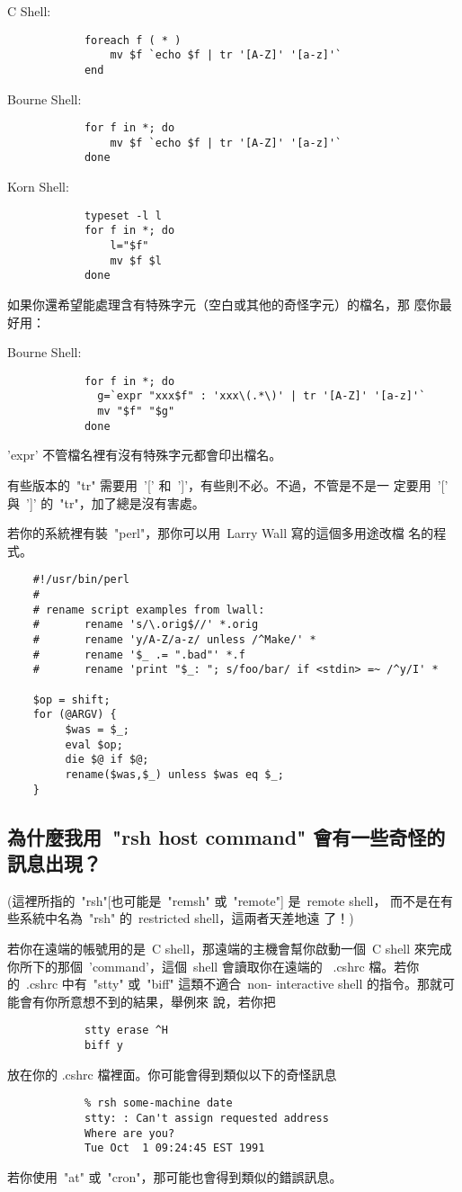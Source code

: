 \documentclass{article}
\begin{document}
\begin{CJK*}{Bg5}{ming}
        C Shell:
\begin{verbatim}
            foreach f ( * )
                mv $f `echo $f | tr '[A-Z]' '[a-z]'`
            end
\end{verbatim}

        Bourne Shell:
\begin{verbatim}
            for f in *; do
                mv $f `echo $f | tr '[A-Z]' '[a-z]'`
            done
\end{verbatim}

        Korn Shell:
\begin{verbatim}
            typeset -l l
            for f in *; do
                l="$f"
                mv $f $l
            done
\end{verbatim}
	如果你還希望能處理含有特殊字元（空白或其他的奇怪字元）的檔名，那
	麼你最好用：

        Bourne Shell:
\begin{verbatim}
            for f in *; do
              g=`expr "xxx$f" : 'xxx\(.*\)' | tr '[A-Z]' '[a-z]'`
              mv "$f" "$g"
            done
\end{verbatim}
	'expr' 不管檔名裡有沒有特殊字元都會印出檔名。

	有些版本的~"tr" 需要用~'[' 和~']'，有些則不必。不過，不管是不是一
	定要用~'['  與~']' 的~"tr"，加了總是沒有害處。

	若你的系統裡有裝~"perl"，那你可以用~Larry Wall 寫的這個多用途改檔
	名的程式。 
\begin{verbatim}
	#!/usr/bin/perl
	#
	# rename script examples from lwall:
	#       rename 's/\.orig$//' *.orig
	#       rename 'y/A-Z/a-z/ unless /^Make/' *
	#       rename '$_ .= ".bad"' *.f
	#       rename 'print "$_: "; s/foo/bar/ if <stdin> =~ /^y/I' *

	$op = shift;
	for (@ARGV) {
	     $was = $_;
	     eval $op;
	     die $@ if $@;
	     rename($was,$_) unless $was eq $_;
	}
\end{verbatim}

\subsection{為什麼我用~"rsh host command" 會有一些奇怪的訊息出現？}

	(這裡所指的~"rsh"[也可能是~"remsh" 或~"remote"] 是~remote shell，
	而不是在有些系統中名為~"rsh" 的~restricted shell，這兩者天差地遠
	了！)

	若你在遠端的帳號用的是~C shell，那遠端的主機會幫你啟動一個~C 
	shell 來完成你所下的那個~'command'，這個~shell 會讀取你在遠端的  
	~.cshrc 檔。若你的~.cshrc 中有~"stty" 或~"biff" 這類不適合~non-
	interactive shell 的指令。那就可能會有你所意想不到的結果，舉例來
	說，若你把
\begin{verbatim}
	        stty erase ^H
	        biff y
\end{verbatim}
	放在你的 .cshrc 檔裡面。你可能會得到類似以下的奇怪訊息
\begin{verbatim}
	        % rsh some-machine date
	        stty: : Can't assign requested address
	        Where are you?
	        Tue Oct  1 09:24:45 EST 1991
\end{verbatim}
	若你使用~"at" 或~"cron"，那可能也會得到類似的錯誤訊息。


\end{CJK*}
\end{document}
